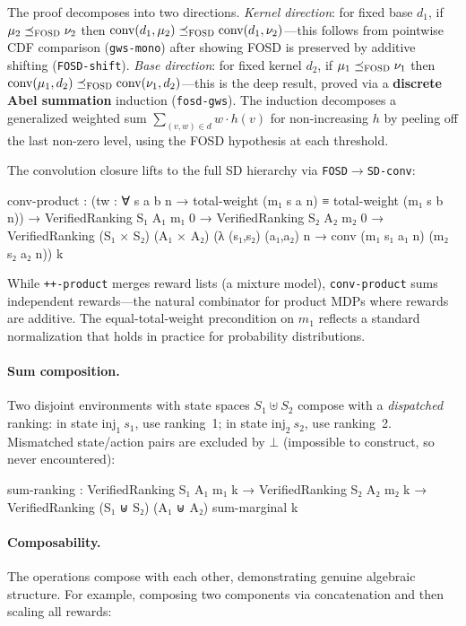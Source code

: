 \documentclass[9pt,a4paper]{article}
\theoremstyle{plain}
\theoremstyle{definition}
\theoremstyle{remark}
\begin{document}
\noindent The proof decomposes into two directions.  \emph{Kernel direction}: for fixed base $d_1$, if $\mu_2 \preceq_\textsc{FOSD} \nu_2$ then $\text{conv}(d_1, \mu_2) \preceq_\textsc{FOSD} \text{conv}(d_1, \nu_2)$---this follows from pointwise CDF comparison (\texttt{gws-mono}) after showing FOSD is preserved by additive shifting (\texttt{FOSD-shift}).  \emph{Base direction}: for fixed kernel $d_2$, if $\mu_1 \preceq_\textsc{FOSD} \nu_1$ then $\text{conv}(\mu_1, d_2) \preceq_\textsc{FOSD} \text{conv}(\nu_1, d_2)$---this is the deep result, proved via a \textbf{discrete Abel summation} induction (\texttt{fosd-gws}).  The induction decomposes a generalized weighted sum $\sum_{(v,w) \in d} w \cdot h(v)$ for non-increasing $h$ by peeling off the last non-zero level, using the FOSD hypothesis at each threshold.

The convolution closure lifts to the full SD hierarchy via \texttt{FOSD$\to$SD-conv}:

\begin{spec}
  conv-product :
    (tw : ∀ s a b n → total-weight (m₁ s a n) ≡ total-weight (m₁ s b n)) →
    VerifiedRanking S₁ A₁ m₁ 0 → VerifiedRanking S₂ A₂ m₂ 0 →
    VerifiedRanking (S₁ × S₂) (A₁ × A₂)
      (λ (s₁,s₂) (a₁,a₂) n → conv (m₁ s₁ a₁ n) (m₂ s₂ a₂ n)) k
\end{spec}

\noindent While \texttt{++-product} merges reward lists (a mixture model), \texttt{conv-product} sums independent rewards---the natural combinator for product MDPs where rewards are additive.  The equal-total-weight precondition on $m_1$ reflects a standard normalization that holds in practice for probability distributions.

\paragraph{Sum composition.}  Two disjoint environments with state spaces $S_1 \uplus S_2$ compose with a \emph{dispatched} ranking: in state $\text{inj}_1~s_1$, use ranking~1; in state $\text{inj}_2~s_2$, use ranking~2.  Mismatched state/action pairs are excluded by $\bot$ (impossible to construct, so never encountered):

\begin{spec}
  sum-ranking :
    VerifiedRanking S₁ A₁ m₁ k → VerifiedRanking S₂ A₂ m₂ k →
    VerifiedRanking (S₁ ⊎ S₂) (A₁ ⊎ A₂) sum-marginal k
\end{spec}

\paragraph{Composability.}  The operations compose with each other, demonstrating genuine algebraic structure.  For example, composing two components via concatenation and then scaling all rewards:
\end{document}
